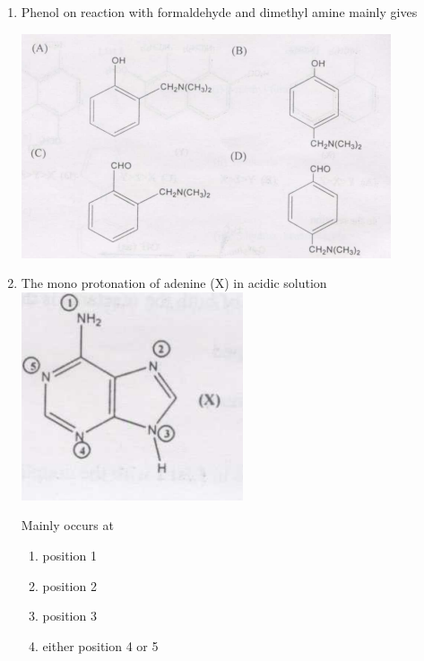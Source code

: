 \documentclass[journal,12pt,onecolumn]{IEEEtran}
\theoremstyle{remark}
\begin{document}
\begin{enumerate}
\begin{multicols}{2}
\begin{enumerate}
     \item   a-i \quad b-ii \quad c-iii
     \item   a-ii \quad b-iii \quad c-i
     \item   a-iii \quad b-ii \quad c-i
     \item   a-iii \quad b-i \quad c-ii
\end{enumerate}
\end{multicols}

\item  Phenol on reaction with formaldehyde and dimethyl amine mainly gives \hfill{}

\includegraphics[scale=1.5 ]{figs/image4.png}

  

\item  The mono protonation of adenine (X) in acidic solution \hfill{}
\includegraphics[scale=1.5 ]{figs/image5.png}


Mainly occurs at \hfill{  }

\begin{multicols}{2}
\begin{enumerate}
     \item   position 1
     \item   position 2
     \item   position 3
     \item   either position 4 or 5
\end{enumerate}
\end{multicols}


\end{enumerate}
\end{document}
